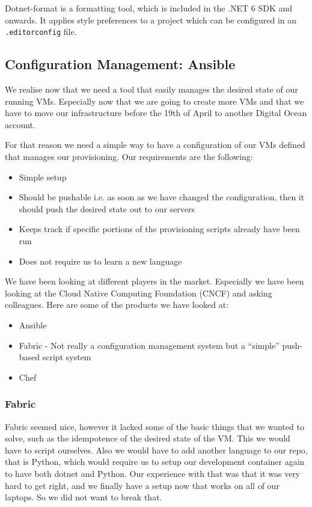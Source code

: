 Dotnet-format is a formatting tool, which is included in the .NET 6 SDK and onwards. It applies style preferences to a project which can be configured in an \texttt{.editorconfig} file.

\subsection{Configuration Management: Ansible}

We realise now that we need a tool that easily manages the desired state of our running VMs. Especially now that we are going to create more VMs and that we have to move our infrastructure before the 19th of April to another Digital Ocean account.

For that reason we need a simple way to have a configuration of our VMs defined that manages our provisioning. Our requirements are the following:

\begin{itemize}
    \item Simple setup
    \item Should be pushable i.e. as soon as we have changed the configuration, then it should push the desired state out to our servers
    \item Keeps track if specific portions of the provisioning scripts already have been run
    \item Does not require us to learn a new language
\end{itemize}

We have been looking at different players in the market. Especially we have been looking at the Cloud Native Computing Foundation (CNCF) and asking colleagues. Here are some of the products we have looked at:

\begin{itemize}
    \item Ansible
    \item Fabric - Not really a configuration management system but a “simple” push-based script system
    \item Chef
\end{itemize}

\subsubsection{Fabric}

Fabric seemed nice, however it lacked some of the basic things that we wanted to solve, such as the idempotence of the desired state of the VM. This we would have to script ourselves. Also we would have to add another language to our repo, that is Python, which would require us to setup our development container again to have both dotnet and Python. Our experience with that was that it was very hard to get right, and we finally have a setup now that works on all of our laptops. So we did not want to break that.

